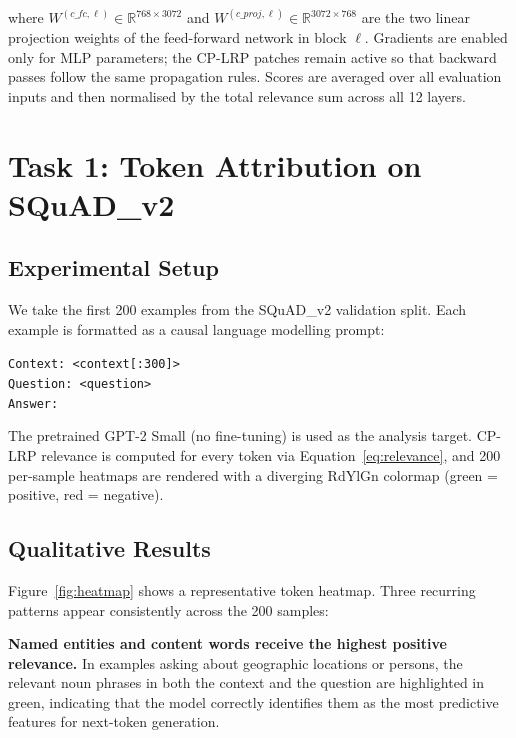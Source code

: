 \documentclass[10pt,twocolumn,letterpaper]{article}
\begin{document}
where $W^{(c\_fc,\ell)} \in \mathbb{R}^{768 \times 3072}$ and
$W^{(c\_proj,\ell)} \in \mathbb{R}^{3072 \times 768}$ are the two linear
projection weights of the feed-forward network in block $\ell$.
Gradients are enabled only for MLP parameters; the CP-LRP patches remain
active so that backward passes follow the same propagation rules.
Scores are averaged over all evaluation inputs and then normalised by the total
relevance sum across all 12 layers.

\section{Task 1: Token Attribution on SQuAD\_v2}
\label{sec:task1}

\subsection{Experimental Setup}

We take the first 200 examples from the SQuAD\_v2 validation split.
Each example is formatted as a causal language modelling prompt:

\vspace{3pt}
\texttt{Context: <context[:300]>}\\
\texttt{Question: <question>}\\
\texttt{Answer:}
\vspace{3pt}

The pretrained GPT-2 Small (no fine-tuning) is used as the analysis target.
CP-LRP relevance is computed for every token via Equation~\eqref{eq:relevance},
and 200 per-sample heatmaps are rendered with a diverging RdYlGn colormap
(green = positive, red = negative).

\subsection{Qualitative Results}

Figure~\ref{fig:heatmap} shows a representative token heatmap.
Three recurring patterns appear consistently across the 200 samples:

\textbf{Named entities and content words receive the highest positive
relevance.}
In examples asking about geographic locations or persons, the relevant noun
phrases in both the context and the question are highlighted in green,
indicating that the model correctly identifies them as the most predictive
features for next-token generation.
\end{document}
